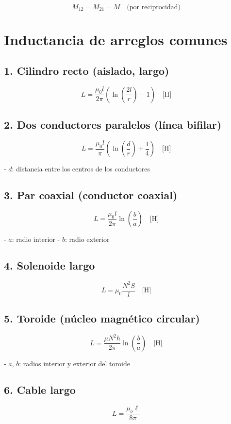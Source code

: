\documentclass[11pt]{article}
\begin{document}
\begin{multicols}{2}
\[
\boxed{M_{12} = M_{21} = M}
\quad\text{(por reciprocidad)}
\]


\section*{Inductancia de arreglos comunes}

\subsection*{1. Cilindro recto (aislado, largo)}

\[
L = \frac{\mu_0 l}{2\pi} \left( \ln\left( \frac{2l}{r} \right) - 1 \right)
\quad\text{[H]}
\]

\subsection*{2. Dos conductores paralelos (línea bifilar)}

\[
L = \frac{\mu_0 l}{\pi} \left( \ln\left( \frac{d}{r} \right) + \frac{1}{4} \right)
\quad\text{[H]}
\]

- \( d \): distancia entre los centros de los conductores  

\subsection*{3. Par coaxial (conductor coaxial)}

\[
L = \frac{\mu_0 l}{2\pi} \ln\left( \frac{b}{a} \right)
\quad\text{[H]}
\]

- \( a \): radio interior  
- \( b \): radio exterior  

\subsection*{4. Solenoide largo}

\[
L = \mu_0 \frac{N^2 S}{l}
\quad\text{[H]}
\]


\subsection*{5. Toroide (núcleo magnético circular)}

\[
L = \frac{\mu N^2 h}{2\pi} \ln\left( \frac{b}{a} \right)
\quad\text{[H]}
\]

- \( a \), \( b \): radios interior y exterior del toroide  


\subsection*{6. Cable largo}

\[
L = \frac{\mu_o \ell}{8\pi}
\]

\end{multicols}
\end{document}
